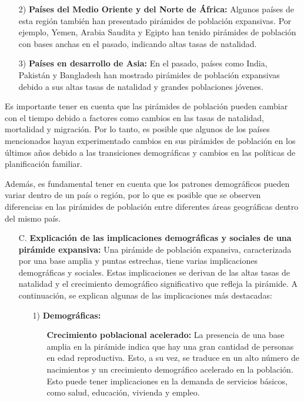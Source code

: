 \documentclass[8pt,a4paper]{beamer}
\begin{document}
{\begin{frame}{}
\begin{block}{}
\begin{enumerate}
\begin{enumerate}
\item[2)] \textbf{Países del Medio Oriente y del Norte de África:} Algunos países de esta región también han presentado pirámides de población expansivas. Por ejemplo, Yemen, Arabia Saudita y Egipto han tenido pirámides de población con bases anchas en el pasado, indicando altas tasas de natalidad.

\item[3)] \textbf{Países en desarrollo de Asia:} En el pasado, países como India, Pakistán y Bangladesh han mostrado pirámides de población expansivas debido a sus altas tasas de natalidad y grandes poblaciones jóvenes.
\end{enumerate}
Es importante tener en cuenta que las pirámides de población pueden cambiar con el tiempo debido a factores como cambios en las tasas de natalidad, mortalidad y migración. Por lo tanto, es posible que algunos de los países mencionados hayan experimentado cambios en sus pirámides de población en los últimos años debido a las transiciones demográficas y cambios en las políticas de planificación familiar.

Además, es fundamental tener en cuenta que los patrones demográficos pueden variar dentro de un país o región, por lo que es posible que se observen diferencias en las pirámides de población entre diferentes áreas geográficas dentro del mismo país.
\end{enumerate}
\end{block}
\end{frame}

\begin{frame}{}
\begin{block}{}
\justifying
\begin{enumerate}
\justifying
\item[C.] \textbf{Explicación de las implicaciones demográficas y sociales de una pirámide expansiva:} Una pirámide de población expansiva, caracterizada por una base amplia y puntas estrechas, tiene varias implicaciones demográficas y sociales. Estas implicaciones se derivan de las altas tasas de natalidad y el crecimiento demográfico significativo que refleja la pirámide. A continuación, se explican algunas de las implicaciones más destacadas:
\begin{enumerate}
\justifying
\item[1)] \textbf{Demográficas:} 
\begin{itemize}
\justifying
\item[\ding{65}] \textbf{Crecimiento poblacional acelerado:} La presencia de una base amplia en la pirámide indica que hay una gran cantidad de personas en edad reproductiva. Esto, a su vez, se traduce en un alto número de nacimientos y un crecimiento demográfico acelerado en la población. Esto puede tener implicaciones en la demanda de servicios básicos, como salud, educación, vivienda y empleo.


\end{itemize}
\end{enumerate}
\end{enumerate}
\end{block}
\end{frame}}
\end{document}
